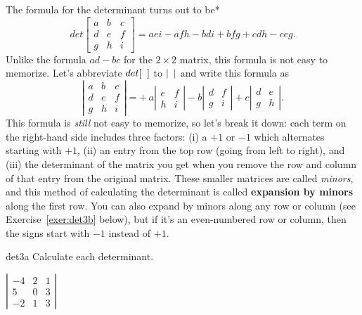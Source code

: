 \documentclass[indent]{watsonbook}
\begin{document}
{The formula for the determinant turns out to be*
\[
  {d}et \left[
    \begin{array}{ccc}
      a & b & c \\ d & e & f \\ g & h & i
    \end{array}
  \right] =
  aei - afh - bdi + bfg + cdh - ceg.
\]
Unlike the formula $ad - bc$ for the $2\times 2$ matrix, this formula
is not easy to memorize. Let's abbreviate ${d}et [ \hphantom{a} ]$ to
$| \hphantom{a}|$ and write this formula as
\[
  \left|\begin{array}{ccc} a & b & c \\ d & e & f \\ g & h & i \end{array}\right| =
  +\hspace{2pt}a \left|\begin{array}{cc} e & f \\  h & i \end{array}\right|
  -b \left|\begin{array}{cc} d & f \\  g & i \end{array}\right|
  +c \left|\begin{array}{cc} d & e \\  g & h \end{array}\right|.
\]
This formula is \textit{still} not easy to memorize, so let's break it
down: each term on the right-hand side includes three factors: (i) a $+1$ or
$-1$ which alternates starting with $+1$, (ii) an entry from the top
row (going from left to right), and (iii) the determinant of the matrix you
get when you remove the row and column of that entry from the original
matrix. These smaller matrices are called \textit{minors}, and this
method of calculating the determinant is called \textbf{expansion by
  minors} along the first row. You can also expand by minors along any
row or column (see Exercise~\ref{exer:det3b} below), but if it's an
even-numbered row or column, then the signs start with $-1$ instead of
$+1$.

\begin{exercise}{}{det3a} \setcounter{subitm}{1}
  Calculate each determinant.

  {$\left|
      \begin{array}{ccc}
        -4 & 2 & 1 \\ 5 & 0 & 3 \\ -2 & 1 & 3
      \end{array}\right|$}
\end{exercise}

}
\end{document}
